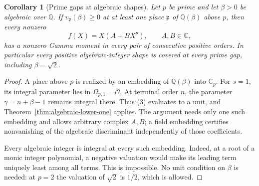 \documentclass[11pt]{article}
\newtheorem{corollary}[lemma]{Corollary}
\newcommand{\Cp}{\mathbb C_p}
\newcommand{\Q}{\mathbb Q}
\newcommand{\C}{\mathbb C}
\newcommand{\OO}{\mathcal O}
\begin{document}
\begin{corollary}[Prime gaps at algebraic shapes]\label{cor:prime-gap-algebraic-shapes}
Let $p$ be prime and let $\beta>0$ be algebraic over $\Q$.
If $v_{\mathfrak p}(\beta)\ge0$ at at least one place
$\mathfrak p$ of $\Q(\beta)$ above $p$, then every nonzero
\[
 f(X)=X(A+BX^p),\qquad A,B\in\C,
\]
has a nonzero Gamma moment in every pair of consecutive positive orders.
In particular every positive algebraic-integer shape is covered at
every prime gap, including $\beta=\sqrt2$.
\end{corollary}
\begin{proof}
A place above $p$ is realized by an embedding of $\Q(\beta)$ into $\Cp$.
For $s=1$, its integral parameter lies in $\Omega_{p,1}=\OO$.
At terminal order $n$, the parameter $\gamma=n+\beta-1$
remains integral there. Thus (3) evaluates to a unit, and
Theorem~\ref{thm:algebraic-lower-one} applies.
The argument needs only one such embedding and allows arbitrary
complex $A,B$; a field embedding certifies nonvanishing of the algebraic
discriminant independently of those coefficients.

Every algebraic integer is integral at every such embedding.
Indeed, at a root of a monic integer polynomial, a negative valuation
would make its leading term uniquely least among all terms.
This is impossible. No unit condition on $\beta$ is needed:
at $p=2$ the valuation of $\sqrt2$ is $1/2$, which is allowed.
\end{proof}
\end{document}
